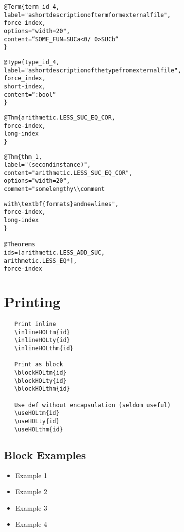 \documentclass{article}
\begin{document}
\begin{alltt}
@Term\{term_id_4,
   label = "a short description of term form external file",
   force_index,
   options = "width=20",
   content = ``SOME_FUN = SUC a < 0 /\ 0 > SUC b``
\}

@Type\{type_id_4,
   label = "a short description of the type from external file",
   force_index,
   short-index,
   content = ``:bool``
\}

@Thm\{arithmetic.LESS_SUC_EQ_COR,
   force-index,
   long-index
\}

@Thm\{thm_1,
   label = "(second instance)",
   content = "arithmetic.LESS_SUC_EQ_COR",
   options = "width=20",
   comment = "some lengthy\verb-\\-comment

              with \verb-\-textbf\{formats\} and newlines",
   force-index,
   long-index
\}

@Theorems{
   ids = [arithmetic.LESS_ADD_SUC,
          arithmetic.LESS_EQ*],
   force-index
}
\end{alltt}






\section{Printing}

\begin{verbatim}
   Print inline
   \inlineHOLtm{id}
   \inlineHOLty{id}
   \inlineHOLthm{id}

   Print as block
   \blockHOLtm{id}
   \blockHOLty{id}
   \blockHOLthm{id}

   Use def without encapsulation (seldom useful)
   \useHOLtm{id}
   \useHOLty{id}
   \useHOLthm{id}
\end{verbatim}

\subsection{Block Examples}
\begin{itemize}
\item Example 1 
\item Example 2 
\item Example 3 
\item Example 4 
\end{itemize}
\end{document}
